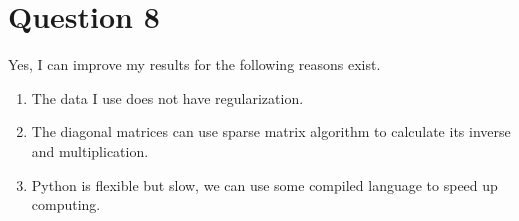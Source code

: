 \documentclass{article}
\begin{document}
\section{Question 8}
Yes, I can improve my results for the following reasons exist.
\begin{enumerate}
    \item The data I use does not have regularization.
    \item The diagonal matrices can use sparse matrix algorithm to calculate its inverse and multiplication.
    \item Python is flexible but slow, we can use some compiled language to speed up computing.
\end{enumerate}
\end{document}
